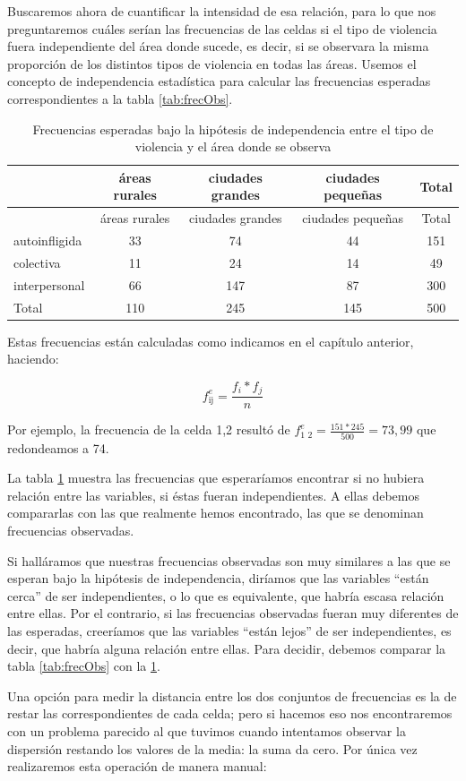 \documentclass[]{book}
\begin{document}
Buscaremos ahora de cuantificar la intensidad de esa relación, para lo que nos preguntaremos cuáles serían las frecuencias de las celdas si el tipo de violencia fuera independiente del área donde sucede, es decir, si se observara la misma proporción de los distintos tipos de violencia en todas las áreas. Usemos el concepto de independencia estadística para calcular las frecuencias esperadas correspondientes a la tabla \ref{tab:frecObs}.

\begin{longtable}[]{@{}lcccc@{}}
\caption{\label{tab:frecEsperada}Frecuencias esperadas bajo la hipótesis de independencia entre el tipo de violencia y el área donde se observa}\tabularnewline
\toprule
& áreas rurales & ciudades grandes & ciudades pequeñas & Total\tabularnewline
\midrule
\endfirsthead
\toprule
& áreas rurales & ciudades grandes & ciudades pequeñas & Total\tabularnewline
\midrule
\endhead
autoinfligida & 33 & 74 & 44 & 151\tabularnewline
colectiva & 11 & 24 & 14 & 49\tabularnewline
interpersonal & 66 & 147 & 87 & 300\tabularnewline
Total & 110 & 245 & 145 & 500\tabularnewline
\bottomrule
\end{longtable}

Estas frecuencias están calculadas como indicamos en el capítulo
anterior, haciendo:

\[f_{\text{ij}}^{e} = \frac{f_{i}*f_{j}}{n}\]

Por ejemplo, la frecuencia de la celda 1,2 resultó de \(f_{\text{1 2}}^{e} = \frac{151*245}{500} = 73,99\) que redondeamos a 74.

La tabla \ref{tab:frecEsperada} muestra las frecuencias que esperaríamos encontrar si no hubiera relación entre las variables, si éstas fueran independientes. A ellas debemos compararlas con las que realmente hemos encontrado, las que se denominan frecuencias observadas.

Si halláramos que nuestras frecuencias observadas son muy similares a
las que se esperan bajo la hipótesis de independencia, diríamos que las variables ``están cerca'' de ser independientes, o lo que es equivalente, que habría escasa relación entre ellas. Por el contrario, si las frecuencias observadas fueran muy diferentes de las esperadas, creeríamos que las variables ``están lejos'' de ser independientes, es decir, que habría alguna relación entre ellas. Para decidir, debemos comparar la tabla \ref{tab:frecObs} con la \ref{tab:frecEsperada}.

Una opción para medir la distancia entre los dos conjuntos de frecuencias es la de restar las correspondientes de cada celda; pero si hacemos eso nos encontraremos con un problema parecido al que tuvimos cuando intentamos observar la dispersión restando los valores de la media: la suma da cero. Por única vez realizaremos esta operación de manera manual:
\end{document}
